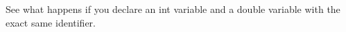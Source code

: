 

See what happens if you declare an int variable and a double variable with the exact same identifier.

